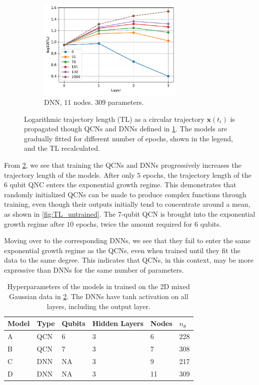 \begin{figure}[H]
\begin{subfigure}[t]{0.5\textwidth}
    \end{subfigure}%
    \hfill 
    \begin{subfigure}[t]{0.5\textwidth}
        \centering
        \includegraphics[height=1.9in]{latex/figures/TL_trained_DNN_nodes_11}
        \caption{DNN, 11 nodes. 309 parameters.}
        \label{fig:TL_trained_D}
    \end{subfigure}
    \caption{Logarithmic trajectory length (TL) as a circular trajectory $\boldsymbol{x}(t_i)$ is propagated though QCNs and DNNs defined in \cref{tab:TL models}. The models are gradually fitted for different number of epochs, shown in the legend, and the TL recalculated.}
    \label{fig:TL_trained}
\end{figure}

From \cref{fig:TL_trained}, we see that training the QCNs and DNNs progressively increases the trajectory length of the models. After only $5$ epochs, the trajectory length of the 6 qubit QNC enters the exponential growth regime. This demonstrates that randomly initialized QCNs can be made to produce complex functions through training, even though their outputs initially tend to concentrate around a mean, as shown in \cref{fig:TL_untrained}. The 7-qubit QCN is brought into the exponential growth regime after $10$ epochs, twice the amount required for 6 qubits. 

Moving over to the corresponding DNNs, we see that they fail to enter the same exponential growth regime as the QCNs, even when trained until they fit the data to the same degree. This indicates that QCNs, in this context, may be more expressive than DNNs for the same number of parameters.  

\begin{table}[H]
\centering
\begin{tabular}{|l|l|l|l|l|l|}
\hline
Model &Type & Qubits& Hidden Layers & Nodes &$n_{\theta}$ \\ \hline
A    & QCN & 6 &  3 & 6& 228   \\ \hline
B    & QCN & 7 &  3 & 7& 308 \\ \hline
C    & DNN & NA&  3 & 9& 217  \\ \hline
D    & DNN & NA&  3 & 11& 309  \\ \hline
\end{tabular}
\caption{Hyperparameters of the models in trained on the 2D mixed Gaussian data in \cref{fig:TL_trained}. The DNNs have tanh activation on all layers, including the output layer.} 
\label{tab:TL models}
\end{table}


